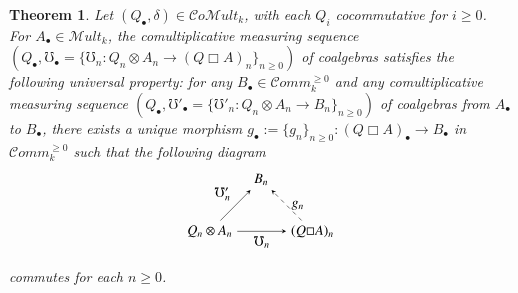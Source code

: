 \documentclass[10pt, colorlinks]{article}
\numberwithin{equation}{section} \DeclareMathSizes{2}{10}{12}{13}
\newtheorem{Thm}[thm]{Theorem}
\begin{document}
        
        \begin{Thm}\label{thm6.10}
            Let   $(Q_\bullet,\delta)\in \mathcal Co\mathscr Mult_k$, with each $Q_i$ cocommutative for $i\geq 0$. For $A_\bullet \in \mathscr Mult_k$, the comultiplicative measuring sequence $(Q_\bullet,\mho_\bullet=\{\mho_n: Q_n\otimes A_n\longrightarrow (Q\Box A)_n\}_{n\geq 0})$ of coalgebras satisfies the following universal property: for any $B_\bullet\in \mathcal Comm_k^{\geq 0}$ and any comultiplicative measuring sequence $(Q_\bullet,\mho'_\bullet=\{\mho'_n: Q_n\otimes A_n\longrightarrow B_n\}_{n\geq 0})$ of coalgebras from $A_\bullet$ to $B_\bullet$, there exists a unique morphism $g_\bullet:=\{g_n\}_{n\geq 0}:(Q\Box A)_\bullet \longrightarrow B_\bullet$ in $\mathcal Comm_k^{\geq 0}$ such that the following diagram 
    \begin{equation}\label{dgi615}
\begin{array}{c}
    \begin{tikzpicture}[>=stealth]
\node (A) at (0,0) {$Q_n\otimes A_n$};
\node (B) at (1.3,1.3) {$B_n$};
\node (C) at (2.6,0) {$(Q \Box A)_n$};

\draw[->] (A) -- node[above left] {$\mho'_n$} (B);
\draw[->] (A) -- node[below ] {$\mho_n$} (C);
\draw[->, dashed] (C) -- node[right] {$g_n$} (B);
\end{tikzpicture}
\end{array}
\end{equation}
commutes for each $n\geq 0$.
        \end{Thm}
\end{document}
